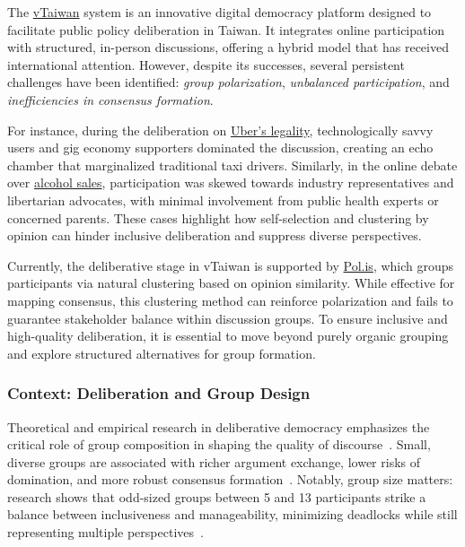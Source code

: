 The \href{https://vtaiwan.tw}{vTaiwan} system is an innovative digital democracy platform
designed to facilitate public policy deliberation in Taiwan.
It integrates online participation with structured, in-person discussions,
offering a hybrid model that has received international attention.
However, despite its successes, several persistent challenges have been identified:
\textit{group polarization}, \textit{unbalanced participation},
and \textit{inefficiencies in consensus formation}.

For instance, during the deliberation
on \href{https://blog.pol.is/uber-responds-to-vtaiwans-coherent-blended-volition-3e9b75102b9b}{Uber's legality},
technologically savvy users and gig economy supporters dominated the discussion,
creating an echo chamber that marginalized traditional taxi drivers.
Similarly, in the online debate over
\href{https://www.technologyreview.com/2018/08/21/240284/the-simple-but-ingenious-system-taiwan-uses-to-crowdsource-its-laws/}{alcohol sales},
participation was skewed towards industry representatives and libertarian advocates,
with minimal involvement from public health experts or concerned parents.
These cases highlight how self-selection and clustering by opinion can hinder inclusive deliberation
and suppress diverse perspectives.

Currently, the deliberative stage in vTaiwan is supported by \href{https://pol.is/home}{Pol.is},
which groups participants via natural clustering based on opinion similarity.
While effective for mapping consensus, this clustering method can reinforce polarization
and fails to guarantee stakeholder balance within discussion groups.
To ensure inclusive and high-quality deliberation, it is essential to move beyond purely organic grouping
and explore structured alternatives for group formation.

\subsubsection*{Context: Deliberation and Group Design}

Theoretical and empirical research in deliberative democracy emphasizes
the critical role of group composition in shaping the quality of
discourse~\parencite{fay2000group}.
Small, diverse groups are associated with richer argument exchange, lower risks of domination,
and more robust consensus
formation~\parencite{anagnostopoulos2012groupformation}.
Notably, group size matters: research shows that odd-sized groups between 5 and 13 participants
strike a balance between inclusiveness and manageability,
minimizing deadlocks while still representing multiple
perspectives~\parencite{fishkin2009deliberative}.

